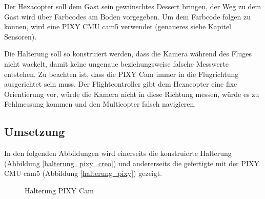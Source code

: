	Der Hexacopter soll dem Gast sein gewünschtes Dessert bringen, der Weg zu dem Gast wird über Farbcodes am Boden vorgegeben.
	Um dem Farbcode folgen zu können, wird eine PIXY CMU cam5 verwendet (genaueres siehe Kapitel Sensoren).

	Die Halterung soll so konstruiert werden, dass die Kamera während des Fluges nicht wackelt, damit keine ungenaue beziehungsweise falsche Messwerte entstehen.
	Zu beachten ist, dass die PIXY Cam immer in die Flugrichtung ausgerichtet sein muss.
	Der Flightcontroller gibt dem Hexacopter eine fixe Orientierung vor, würde die Kamera nicht in diese Richtung messen, würde es zu Fehlmessung kommen und den Multicopter falsch navigieren.

	\subsection{Umsetzung}

	In den folgenden Abbildungen wird einerseits die konstruierte Halterung (Abbildung \ref{halterung_pixy_creo})
	und andererseits die gefertigte  mit der PIXY CMU cam5 (Abbildung \ref{halterung_pixy}) gezeigt.

			\begin{figure}[thb]
				\begin{centering}
				\par\end{centering}
				\caption{Halterung PIXY Cam}
				\label{Halterung_PIXY}
			\end{figure}

